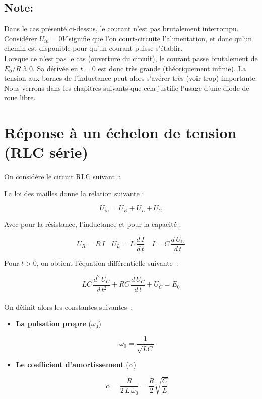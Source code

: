 \subsection*{Note:}

Dans le cas présenté ci-dessus, le courant n'est pas brutalement interrompu. Considérer $U_{in} = 0V$ signifie que l'on court-circuite l'alimentation, et donc qu'un chemin est disponible pour qu'un courant puisse s'établir. \\

Lorsque ce n'est pas le cas (ouverture du circuit), le courant passe brutalement de $E_0 / R$ à $0$. Sa dérivée en $t=0$ est donc très grande (théoriquement infinie). La tension aux bornes de l'inductance peut alors s'avérer très (voir trop) importante.  Nous verrons dans les chapitres suivants que cela justifie l'usage d'une diode de roue libre.\\

\section{Réponse à un échelon de tension (RLC série)}

On considère le circuit RLC suivant~:

\begin{center}

\end{center}

La loi des mailles donne la relation suivante :

$$ U_{in} = U_R + U_L + U_C $$

Avec pour la résistance, l'inductance et pour la capacité :

$$ U_R = R\,I \quad U_L = L\,\dfrac{d\,I}{d\,t} \quad I = C \, \dfrac{d\,U_C}{d\,t}$$ 

Pour $t>0$, on obtient l'équation différentielle suivante~:

$$ LC\,\dfrac{d^{2}\,U_C}{d\,t^2} + RC\,\dfrac{d\,U_C}{d\,t} + U_C = E_0 $$ \\

On définit alors les constantes suivantes~:\\

\begin{itemize}
\item \textbf{La pulsation propre} ($\omega_0$)

	$$ \omega_0 = \dfrac{1}{\sqrt{LC}} $$

\item \textbf{Le coefficient d'amortissement} ($\alpha$)

	$$ \alpha = \dfrac{R}{2\,L\,\omega_0} = \dfrac{R}{2}\sqrt{\dfrac{C}{L}}$$

\end{itemize}

